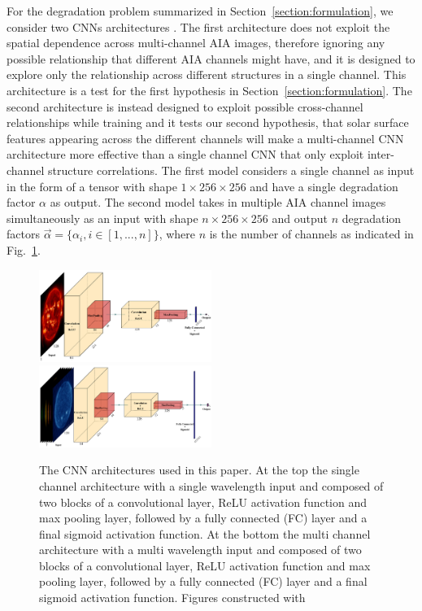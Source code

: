 \documentclass{aa}
\begin{document}
For the degradation problem summarized in Section~\ref{section:formulation}, we consider two CNNs architectures \citep{lecun1995convolutional}. The first architecture does not exploit the spatial dependence across multi-channel AIA images, therefore ignoring any possible relationship that different AIA channels might have, and it is designed to explore only the relationship across different structures in a single channel. This architecture is a test for the first hypothesis in Section~\ref{section:formulation}. The second architecture is instead designed to exploit possible cross-channel relationships while training and it tests our second hypothesis, that solar surface features appearing across the different channels will make a  multi-channel CNN architecture more effective than a single channel CNN that only exploit inter-channel structure correlations. The first model considers a single channel as input in the form of a tensor with shape $1\times256\times256$ and have a single degradation factor $\alpha$ as output. The second model takes in multiple AIA channel images simultaneously as an input with shape $n\times256\times256$ and output $n$ degradation factors $\vec{\alpha} = \{\alpha_i, i \in [1,...,n]\}$, where $n$ is the number of channels as indicated in Fig.~\ref{fig:autocalibrate_CNN_arch}.  

\begin{figure}
    \centering
        \includegraphics[width=0.5\textwidth]{my_arch_one.png}
        \includegraphics[width=0.5\textwidth]{my_arch_multi.png}
        \caption{The CNN architectures used in this paper. At the top the single channel architecture with a single wavelength input and composed of two blocks of a convolutional layer, ReLU activation function and max pooling layer, followed by a fully connected (FC) layer and a final sigmoid activation function. At the bottom the multi channel architecture with a multi wavelength input and composed of two blocks of a convolutional layer, ReLU activation function and max pooling layer, followed by a fully connected (FC) layer and a final sigmoid activation function. Figures constructed with \cite{haris_iqbal_2018_2526396}}
        \label{fig:autocalibrate_CNN_arch}
\end{figure}
	
\end{document}
